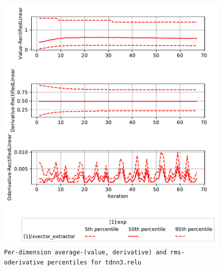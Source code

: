 \documentclass[prl,10pt,twocolumn]{revtex4}
\begin{document}
\newpage
\begin{figure}[h]
  \begin{center}
    \caption{\texttt{Per-dimension average-(value, derivative) and rms-oderivative percentiles for tdnn3.relu}}
    \includegraphics[width=\textwidth]{exp/xvector_extractor/report/nonlinstats_tdnn3_dot_relu.pdf}
  \end{center}
\end{figure}
\clearpage
\end{document}
